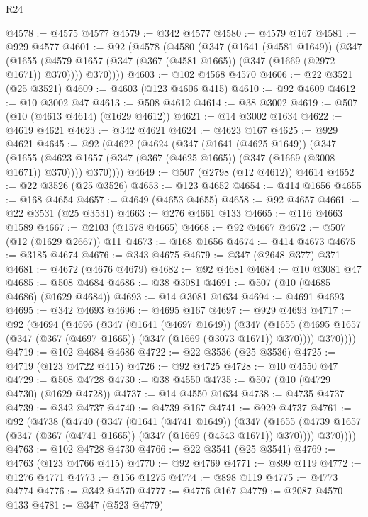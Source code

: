 \begin{lexlean}{R24}
\begin{coremodule}
@4578 := @4575 @4577
@4579 := @342 @4577
@4580 := @4579 @167
@4581 := @929 @4577
@4601 := @92
    (@4578
      (@4580
        (@347
          (@1641 (@4581 @1649))
          (@347
            (@1655 (@4579 @1657 (@347 (@367 (@4581 @1665)) (@347 (@1669 (@2972 @1671)) @370))))
            @370))))
@4603 := @102 @4568 @4570
@4606 := @22 @3521 (@25 @3521)
@4609 := @4603 (@123 @4606 @415)
@4610 := @92 @4609
@4612 := @10 @3002 @47
@4613 := @508 @4612
@4614 := @38 @3002
@4619 := @507 (@10 (@4613 @4614) (@1629 @4612))
@4621 := @14 @3002 @1634
@4622 := @4619 @4621
@4623 := @342 @4621
@4624 := @4623 @167
@4625 := @929 @4621
@4645 := @92
    (@4622
      (@4624
        (@347
          (@1641 (@4625 @1649))
          (@347
            (@1655 (@4623 @1657 (@347 (@367 (@4625 @1665)) (@347 (@1669 (@3008 @1671)) @370))))
            @370))))
@4649 := @507 (@2798 (@12 @4612)) @4614
@4652 := @22 @3526 (@25 @3526)
@4653 := @123 @4652
@4654 := @414 @1656
@4655 := @168 @4654
@4657 := @4649 (@4653 @4655)
@4658 := @92 @4657
@4661 := @22 @3531 (@25 @3531)
@4663 := @276 @4661 @133
@4665 := @116 @4663 @1589
@4667 := @2103 (@1578 @4665)
@4668 := @92 @4667
@4672 := @507 (@12 (@1629 @2667)) @11
@4673 := @168 @1656
@4674 := @414 @4673
@4675 := @3185 @4674
@4676 := @343 @4675
@4679 := @347 (@2648 @377) @371
@4681 := @4672 (@4676 @4679)
@4682 := @92 @4681
@4684 := @10 @3081 @47
@4685 := @508 @4684
@4686 := @38 @3081
@4691 := @507 (@10 (@4685 @4686) (@1629 @4684))
@4693 := @14 @3081 @1634
@4694 := @4691 @4693
@4695 := @342 @4693
@4696 := @4695 @167
@4697 := @929 @4693
@4717 := @92
    (@4694
      (@4696
        (@347
          (@1641 (@4697 @1649))
          (@347
            (@1655 (@4695 @1657 (@347 (@367 (@4697 @1665)) (@347 (@1669 (@3073 @1671)) @370))))
            @370))))
@4719 := @102 @4684 @4686
@4722 := @22 @3536 (@25 @3536)
@4725 := @4719 (@123 @4722 @415)
@4726 := @92 @4725
@4728 := @10 @4550 @47
@4729 := @508 @4728
@4730 := @38 @4550
@4735 := @507 (@10 (@4729 @4730) (@1629 @4728))
@4737 := @14 @4550 @1634
@4738 := @4735 @4737
@4739 := @342 @4737
@4740 := @4739 @167
@4741 := @929 @4737
@4761 := @92
    (@4738
      (@4740
        (@347
          (@1641 (@4741 @1649))
          (@347
            (@1655 (@4739 @1657 (@347 (@367 (@4741 @1665)) (@347 (@1669 (@4543 @1671)) @370))))
            @370))))
@4763 := @102 @4728 @4730
@4766 := @22 @3541 (@25 @3541)
@4769 := @4763 (@123 @4766 @415)
@4770 := @92 @4769
@4771 := @899 @119
@4772 := @1276 @4771
@4773 := @156 @1275
@4774 := @898 @119
@4775 := @4773 @4774
@4776 := @342 @4570
@4777 := @4776 @167
@4779 := @2087 @4570 @133
@4781 := @347 (@523 @4779)

\end{coremodule}
\end{lexlean}
